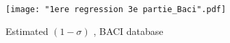 \documentclass[12pt,twoside,a4paper,notitlepage]{article}
\begin{document}
{%

\begin{figure}
\caption{Estimated $(1-\sigma)$ , BACI database}
\texttt{[image: "1ere regression 3e partie\_Baci".pdf]}
\label{fig:reg_Baci}
\end{figure}

}
\end{document}
